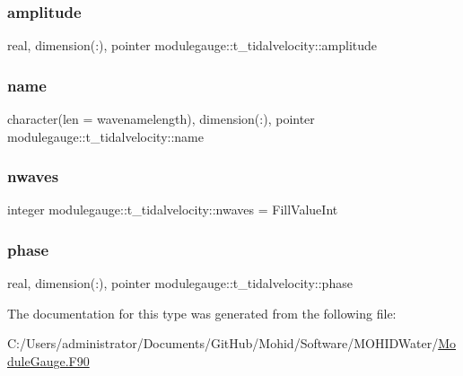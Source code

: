 \subsubsection{\texorpdfstring{amplitude}{amplitude}}
{\footnotesize\ttfamily real, dimension(\+:), pointer modulegauge\+::t\+\_\+tidalvelocity\+::amplitude\hspace{0.3cm}{\ttfamily [private]}}

\mbox{\label{structmodulegauge_1_1t__tidalvelocity_a76fc7e543c9f2c5bd303b8862ea225c4}} 
\subsubsection{\texorpdfstring{name}{name}}
{\footnotesize\ttfamily character(len = wavenamelength), dimension(\+:), pointer modulegauge\+::t\+\_\+tidalvelocity\+::name\hspace{0.3cm}{\ttfamily [private]}}

\mbox{\label{structmodulegauge_1_1t__tidalvelocity_a5b441c1397e7ad8043d9f2b8dd391987}} 
\subsubsection{\texorpdfstring{nwaves}{nwaves}}
{\footnotesize\ttfamily integer modulegauge\+::t\+\_\+tidalvelocity\+::nwaves = Fill\+Value\+Int\hspace{0.3cm}{\ttfamily [private]}}

\mbox{\label{structmodulegauge_1_1t__tidalvelocity_aa682bbb3b22a65fdc5a176428e1d9c97}} 
\subsubsection{\texorpdfstring{phase}{phase}}
{\footnotesize\ttfamily real, dimension(\+:), pointer modulegauge\+::t\+\_\+tidalvelocity\+::phase\hspace{0.3cm}{\ttfamily [private]}}



The documentation for this type was generated from the following file\+:\begin{DoxyCompactItemize}
\item 
C\+:/\+Users/administrator/\+Documents/\+Git\+Hub/\+Mohid/\+Software/\+M\+O\+H\+I\+D\+Water/\mbox{\hyperlink{_module_gauge_8_f90}{Module\+Gauge.\+F90}}\end{DoxyCompactItemize}
